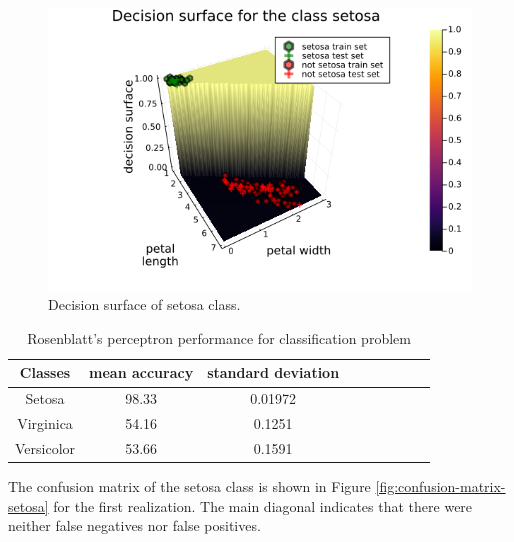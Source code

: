 \documentclass[12pt,a4paper]{article}
\begin{document}
\begin{figure}[H]
    \centering
    \includegraphics[scale=0.35]{../trab1 (single perceptron)/figs/decision-surface-for-setosa.png}
    \caption{Decision surface of setosa class.}
    \label{fig:rosenblatt-decision-surface}
\end{figure}

\begin{table}
	\centering
	\caption{Rosenblatt's perceptron performance for classification problem}
	\footnotesize
	\setlength{\tabcolsep}{5pt}
	\begin{tabular}{ccccccccc}
		\hline
		Classes & mean accuracy & standard deviation \\
		\hline
		Setosa & 98.33 & 0.01972 \\
        \hline
		Virginica & 54.16 & 0.1251 \\
		\hline
		Versicolor & 53.66 & 0.1591 \\
		\hline
	\end{tabular} \label{tab:rosenblatt-results}
\end{table}

The confusion matrix of the setosa class is shown in Figure \ref{fig:confusion-matrix-setosa} for the first realization. The main diagonal indicates that there were neither false negatives nor false positives.
\end{document}
